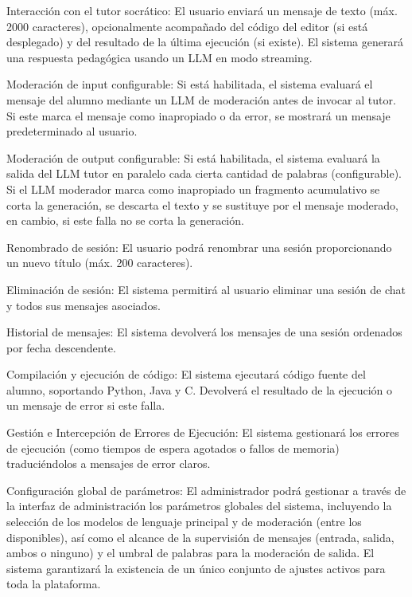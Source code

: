 \begin{functional}
    \item Interacción con el tutor socrático: El usuario enviará un mensaje de texto (máx. 2000 caracteres), opcionalmente acompañado del código del editor (si está desplegado) y del resultado de la última ejecución (si existe). El sistema generará una respuesta pedagógica usando un LLM en modo streaming.

    \item Moderación de input configurable: Si está habilitada, el sistema evaluará el mensaje del alumno mediante un LLM de moderación antes de invocar al tutor. Si este marca el mensaje como inapropiado o da error, se mostrará un mensaje predeterminado al usuario.

    \item Moderación de output configurable: Si está habilitada, el sistema evaluará la salida del LLM tutor en paralelo cada cierta cantidad de palabras (configurable). Si el LLM moderador marca como inapropiado un fragmento acumulativo se corta la generación, se descarta el texto y se sustituye por el mensaje moderado, en cambio, si este falla no se corta la generación.

    \item Renombrado de sesión: El usuario podrá renombrar una sesión proporcionando un nuevo título (máx. 200 caracteres).

    \item Eliminación de sesión: El sistema permitirá al usuario eliminar una sesión de chat y todos sus mensajes asociados.

    \item Historial de mensajes: El sistema devolverá los mensajes de una sesión ordenados por fecha descendente.

    \item Compilación y ejecución de código: El sistema ejecutará código fuente del alumno, soportando Python, Java y C. Devolverá el resultado de la ejecución o un mensaje de error si este falla.

    \item Gestión e Intercepción de Errores de Ejecución: El sistema gestionará los errores de ejecución (como tiempos de espera agotados o fallos de memoria) traduciéndolos a mensajes de error claros.

    \item Configuración global de parámetros: El administrador podrá gestionar a través de la interfaz de administración los parámetros globales del sistema, incluyendo la selección de los modelos de lenguaje principal y de moderación (entre los disponibles), así como el alcance de la supervisión de mensajes (entrada, salida, ambos o ninguno) y el umbral de palabras para la moderación de salida. El sistema garantizará la existencia de un único conjunto de ajustes activos para toda la plataforma.


\end{functional}

